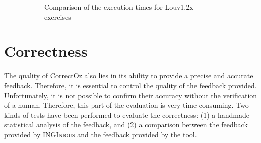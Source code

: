 \documentclass[11pt,a4paper,twoside,openright]{report}
\begin{document}
\begin{figure}[!ht]
\begin{subfigure}[b]{.5\textwidth}
{}
  \caption{Comparison of the execution times for Louv1.2x exercises}
  \label{fig:louv12x_time}
  \end{subfigure}
  \caption{}
\end{figure}


\section{Correctness}
The quality of CorrectOz also lies in its ability to provide a precise and 
accurate feedback. Therefore, it is essential to control the quality of the 
feedback provided. Unfortunately, it is not possible to confirm their accuracy 
without the verification of a human. Therefore, this part of the evaluation is 
very time consuming. Two kinds of tests have been performed to evaluate the 
correctness: (1) a handmade statistical analysis of the feedback, and (2) a 
comparison between the feedback provided by \textsc{INGInious} and 
the feedback provided by the tool.
\end{document}
